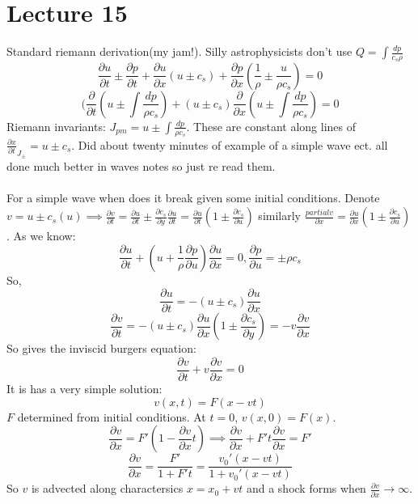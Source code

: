 \documentclass{article}
\begin{document}
\section{Lecture 15}
Standard riemann derivation(my jam!). Silly astrophysicists don't use $Q = \int \frac{dp}{c_s\rho}$
$$
\frac{\partial u}{\partial t} \pm \frac{\partial p}{\partial t}  + \frac{\partial u}{\partial x}(u \pm c_s) + \frac{\partial p}{\partial x}(\frac{1}{\rho} \pm \frac{u}{\rho c_s}) = 0
$$
$$
(\frac{\partial}{\partial t} (u \pm \int \frac{dp}{\rho c_s}) + (u \pm c_s) \frac{\partial}{\partial x}( u \pm \int \frac{dp}{\rho c_s}) = 0
$$
Riemann invariants: $J_{pm} = u \pm \int \frac{dp}{\rho c_s}$. These are constant along lines of $\frac{\partial x}{ \partial t}_{J_{\pm}} = u \pm c_s$.
Did about twenty minutes of example of a simple wave ect. all done much better in waves notes so just re read them. \\\\
For a simple wave when does it break given some initial conditions. Denote $v = u \pm c_s(u) \implies \frac{\partial v}{\partial t} = \frac{\partial u}{\partial t} \pm \frac{\partial c_s}{\partial y} \frac{\partial u}{\partial t} = \frac{\partial u}{\partial t}(1 \pm \frac{\partial c_s}{\partial u})$ similarly $\frac{partial v}{\partial x} = \frac{\partial u}{\partial x}(1 \pm \frac{\partial c_s}{\partial u})$. As we know:
$$
\frac{\partial u}{\partial t} + (u + \frac{1}{\rho}\frac{\partial p}{\partial u}) \frac{\partial u}{\partial x}  = 0, \frac{\partial p}{\partial u} = \pm \rho c_s
$$
So,
$$
\frac{\partial u}{\partial t} = - (u \pm c_s) \frac{\partial u}{\partial x}
$$
$$
\frac{\partial v}{\partial t} = - (u \pm c_s) \frac{\partial u}{\partial x}(1 \pm \frac{\partial c_s}{\partial y}) = -v\frac{\partial v}{\partial x}
$$
So gives the inviscid burgers equation:
\begin{equation}
        \frac{\partial v}{\partial t} + v \frac{\partial v}{\partial x} = 0
\end{equation}
It is has a very simple solution:
$$
v(x,t) = F(x- vt)
$$
$F$ determined from initial conditions. At $t=0$, $v(x,0) = F(x)$.
$$
\frac{\partial v}{\partial x} = F'(1 - \frac{\partial v}{\partial x}t) \implies \frac{\partial v}{\partial x} + F' t \frac{\partial v}{\partial x} = F'
$$
$$
\frac{\partial v}{\partial x} = \frac{F'}{1+F't} = \frac{v_0'(x-vt)}{1+v_0'(x-vt)}
$$
So $v$ is advected along charactersics $x= x_0 + vt$ and a shock forms when $\frac{\partial v}{\partial x} \rightarrow \infty$.
\end{document}
